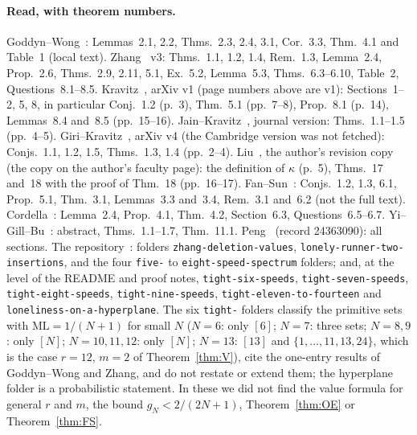 \documentclass[11pt]{article}
\theoremstyle{definition}
\theoremstyle{remark}
\newcommand{\ML}{\mathrm{ML}}
\begin{document}
\paragraph{Read, with theorem numbers.}
Goddyn--Wong~\cite{GW}: Lemmas~2.1, 2.2, Thms.~2.3, 2.4, 3.1, Cor.~3.3, Thm.~4.1 and Table~1 (local text). Zhang~\cite{Z} v3: Thms.~1.1, 1.2, 1.4, Rem.~1.3, Lemma~2.4, Prop.~2.6, Thms.~2.9, 2.11, 5.1, Ex.~5.2, Lemma~5.3, Thms.~6.3--6.10, Table~2, Questions~8.1--8.5. Kravitz~\cite{K}, arXiv v1 (page numbers above are v1): Sections~1--2, 5, 8, in particular Conj.~1.2 (p.~3), Thm.~5.1 (pp.~7--8), Prop.~8.1 (p.~14), Lemmas~8.4 and~8.5 (pp.~15--16). Jain--Kravitz~\cite{JK}, journal version: Thms.~1.1--1.5 (pp.~4--5). Giri--Kravitz~\cite{GK}, arXiv v4 (the Cambridge version was not fetched): Conjs.~1.1, 1.2, 1.5, Thms.~1.3, 1.4 (pp.~2--4). Liu~\cite{L}, the author's revision copy (the copy on the author's faculty page): the definition of $\kappa$ (p.~5), Thms.~17 and~18 with the proof of Thm.~18 (pp.~16--17). Fan--Sun~\cite{FS}: Conjs.~1.2, 1.3, 6.1, Prop.~5.1, Thm.~3.1, Lemmas~3.3 and~3.4, Rem.~3.1 and~6.2 (not the full text). Cordella~\cite{C}: Lemma~2.4, Prop.~4.1, Thm.~4.2, Section~6.3, Questions~6.5--6.7. Yi--Gill--Bu~\cite{YGB}: abstract, Thms.~1.1--1.7, Thm.~11.1. Peng~\cite{P} (record 24363090): all sections. The repository~\cite{R1337}: folders \texttt{zhang-deletion-values}, \texttt{lonely-runner-two-insertions}, and the four \texttt{five-} to \texttt{eight-speed-spectrum} folders; and, at the level of the README and proof notes, \texttt{tight-six-speeds}, \texttt{tight-seven-speeds}, \texttt{tight-eight-speeds}, \texttt{tight-nine-speeds}, \texttt{tight-eleven-to-fourteen} and \texttt{loneliness-on-a-hyperplane}. The six \texttt{tight-} folders classify the primitive sets with $\ML=1/(N+1)$ for small $N$ ($N=6$: only $[6]$; $N=7$: three sets; $N=8,9$: only $[N]$; $N=10,11,12$: only $[N]$; $N=13$: $[13]$ and $\{1,\dots,11,13,24\}$, which is the case $r=12$, $m=2$ of Theorem~\ref{thm:V}), cite the one-entry results of Goddyn--Wong and Zhang, and do not restate or extend them; the hyperplane folder is a probabilistic statement. In these we did not find the value formula for general $r$ and $m$, the bound $g_N<2/(2N+1)$, Theorem~\ref{thm:OE} or Theorem~\ref{thm:FS}.
\end{document}
